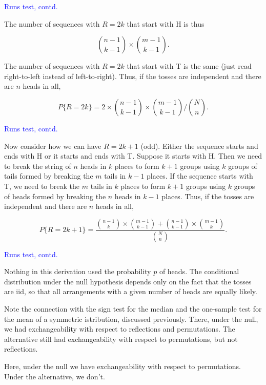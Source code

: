 \documentclass[landscape]{slides}
\newcommand{\beq}{\begin{equation}}
\newcommand{\eeq}{\end{equation}}
\begin{document}
\begin{slide}
{\textcolor{blue}{Runs test, contd.}}

    The number of sequences with $R = 2k$ that
    start with H is thus

\beq    
     {{n-1}\choose{k-1}} \times {{m-1}\choose{k-1}}.
\eeq

    The number of sequences with $R = 2k$ that
    start with T is the same (just read right-to-left instead of left-to-right).
    Thus, if the tosses are independent and there are $n$ heads in all,

\beq
    P\{R = 2k\} = 2 \times {{n-1}\choose{k-1}}
                \times {{m-1}\choose{k-1}}/{{N}\choose{n}}.
\eeq

\end{slide}

\begin{slide}
{\textcolor{blue}{Runs test, contd.}}

Now consider how we can have $R = 2k+1$ (odd).
    Either the sequence starts and ends with H or it starts and ends with T.
    Suppose it starts with H.
    Then we need to break the string of $n$ heads in $k$ places to form
    $k + 1$ groups using $k$ groups of tails formed
    by breaking the $m$ tails in $k-1$ places.
    If the sequence starts with T, we need to break the $m$ tails in $k$
    places to form $k + 1$ groups using $k$ groups of heads formed
    by breaking the $n$ heads in $k-1$ places.
    Thus, if the tosses are independent and there are $n$ heads in all,

\beq    
               P\{R = 2k+1\} = \frac{{{n-1}\choose{k}}
                \times {{m-1}\choose{k-1}} +
                 {{n-1}\choose{k-1}}
                \times {{m-1}\choose{k}}}{{{N}\choose{n}}}.
\eeq

\end{slide}

\begin{slide}
{\textcolor{blue}{Runs test, contd.}}

  Nothing in this derivation used the probability $p$ of heads.
    The conditional distribution under the null hypothesis depends only
    on the fact that the tosses are iid, so that all arrangements with a given
    number of heads are equally likely.
    
    Note the connection with the sign test for the median and the one-sample
    test for the mean of a symmetric istribution, discussed previously.
    There, under the null, we had exchangeability with respect to reflections and
    permutations.
    The alternative still had exchangeability with respect to permutations, but not
    reflections.
    
    Here, under the null we have exchangeability with respect to permutations.
    Under the alternative, we don't. 

\end{slide}
\end{document}
